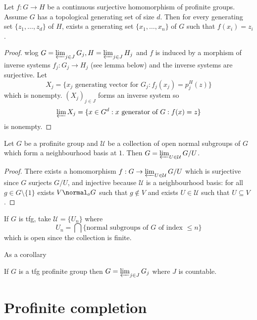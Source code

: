 \documentclass[a4paper]{article}
\begin{document}
\begin{theorem}
  Let \(f: G \to H\) be a continuous surjective homomorphism of profinite groups. Assume \(G\) has a topological generating set of size \(d\). Then for every generating set \(\{z_1, \dots, z_d\}\) of \(H\), exists a generating set \(\{x_1, \dots, x_n\}\) of \(G\) such that \(f(x_i) = z_i\).
\end{theorem}

\begin{proof}
  wlog \(G = \varprojlim_{j \in J} G_j, H = \varprojlim_{j \in J} H_j\) and \(f\) is induced by a morphism of inverse systems \(f_j: G_j \to H_j\) (see lemma below) and the inverse systems are surjective. Let
  \[
    X_j = \{x_j \text{ generating vector for } G_j: f_j(x_j) = p_j^H(z)\}
  \]
  which is nonempty. \((X_j)_{j \in J}\) forms an inverse system so
  \[
    \varprojlim X_j = \{x \in G^d: x \text{ generator of } G: f(x) = z\}
  \]
  is nonempty.
\end{proof}

\begin{proposition}
  Let \(G\) be a profinite group and \(\mathcal U\) be a collection of open normal subgroups of \(G\) which form a neighbourhood basis at \(1\). Then \(G = \varprojlim_{U \in \mathcal U} G/U\).
\end{proposition}

\begin{proof}
  There exists a homomorphism \(f: G \to \varprojlim_{U \in \mathcal U} G/U\) which is surjective since \(G\) surjects \(G/U\), and injective because \(\mathcal U\) is a neighbourhood basis: for all \(g \in G \setminus \{1\}\) exists \(V \normal_o G\) such that \(g \notin V\) and exists \(U \in \mathcal U\) such that \(U \subseteq V\).
\end{proof}

\begin{eg}
  If \(G\) is tfg, take \(\mathcal U = \{U_n\}\) where
  \[
    U_n = \bigcap \{\text{normal subgroups of \(G\) of index \(\leq n\)}\}
  \]
  which is open since the collection is finite.
\end{eg}

As a corollary

\begin{lemma}
  If \(G\) is a tfg profinite group then \(G = \varprojlim_{j \in J} G_j\) where \(J\) is countable.
\end{lemma}

\section{Profinite completion}
\end{document}
